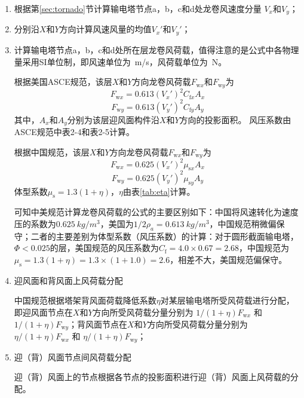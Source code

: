 \begin{enumerate}
	\item 根据第\ref{sec:tornado}节计算输电塔节点a，b，c和d处龙卷风速度分量 $V_x$和$V_y$；
	\item 分别沿$X$和$Y$方向计算风速风量的均值$V_x'$和$V_y'$；
	\item 计算输电塔节点a，b，c和d处所在层龙卷风荷载，值得注意的是公式中各物理量采用SI单位制，即风速单位为\SI{}{m/s}，风荷载单位为\SI{}{N}。
	      
	      根据美国ASCE规范，该层$X$和$Y$方向龙卷风荷载$F_{\mathrm{w}x}$和$F_{\mathrm{w}y}$为
	      \begin{equation}
	      	F_{\mathrm{w}x} = 0.613 (V_{x}')^2 C_{\mathrm{f}x} A_x
	      \end{equation}
	      \begin{equation}
	      	F_{\mathrm{w}y} = 0.613 (V_{y}')^2 C_{\mathrm{f}y} A_y
	      \end{equation}
	      其中，$A_x$和$A_y$分别为该层迎风面构件沿$X$和$Y$方向的投影面积。
	      风压系数由ASCE规范\cite{wong2009guidelines}中表2-4和表2-5计算。
	      
	      根据中国规范，该层$X$和$Y$方向龙卷风荷载$F_{\mathrm{w}x}$和$F_{\mathrm{w}y}$为
	      \begin{equation}
	      	F_{\mathrm{w}x} = 0.625 (V_{x}')^2 \mu_{\mathrm{s}x} A_x 
	      \end{equation}
	      \begin{equation}
	      	F_{\mathrm{w}y} = 0.625 (V_{y}')^2 \mu_{\mathrm{s}y} A_y 
	      \end{equation}
	      体型系数$\mu_\mathrm{s} = 1.3(1+\eta)$，$\eta$由表\ref{tab:eta}计算。
	      
	      可知中美规范计算龙卷风荷载的公式的主要区别如下：中国将风速转化为速度压的系数为$\SI{0.625}{kg/m^3}$，美国为$1/2\rho_a=\SI{0.613}{kg/m^3}$，中国规范稍微偏保守；二者的主要差别为体型系数（风压系数）的计算：对于圆形截面输电塔，$\Phi<0.025$的层，美国规范的风压系数为$C_\mathrm{f}=4.0\times0.67=2.68$，中国规范为$\mu_\mathrm{s}=1.3(1+\eta)=1.3 \times(1+1.0)=2.6$，相差不大，美国规范偏保守。
	      
	\item 迎风面和背风面上风荷载分配
	      
	      中国规范根据塔架背风面荷载降低系数$\eta$对某层输电塔所受风荷载进行分配，即迎风面节点在$X$和$Y$方向所受风荷载分量分别为 $1/(1+\eta) F_{\mathrm{w}x}$ 和 $1/(1+\eta) F_{\mathrm{w}y}$；背风面节点在$X$和$Y$方向所受风荷载分量分别为 $\eta/(1+\eta) F_{\mathrm{w}x}$ 和 $\eta/(1+\eta) F_{\mathrm{w}y}$；
	      
	\item 迎（背）风面节点间风荷载分配
	      
	      迎（背）风面上的节点根据各节点的投影面积进行迎（背）风面上风荷载的分配。
	      
	      
\end{enumerate}


